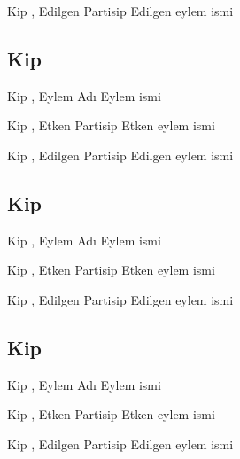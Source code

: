\begin{kip}{}{Kip , Edilgen Partisip}
  Edilgen eylem ismi
\end{kip}


\subsection*{Kip }

\begin{kip}{}{Kip , Eylem Adı}
  Eylem ismi
\end{kip}

\begin{kip}{}{Kip , Etken Partisip}
  Etken eylem ismi
\end{kip}

\begin{kip}{}{Kip , Edilgen Partisip}
  Edilgen eylem ismi
\end{kip}


\subsection*{Kip }

\begin{kip}{}{Kip , Eylem Adı}
  Eylem ismi
\end{kip}

\begin{kip}{}{Kip , Etken Partisip}
  Etken eylem ismi
\end{kip}

\begin{kip}{}{Kip , Edilgen Partisip}
  Edilgen eylem ismi
\end{kip}


\subsection*{Kip }

\begin{kip}{}{Kip , Eylem Adı}
  Eylem ismi
\end{kip}

\begin{kip}{}{Kip , Etken Partisip}
  Etken eylem ismi
\end{kip}

\begin{kip}{}{Kip , Edilgen Partisip}
  Edilgen eylem ismi
\end{kip}


